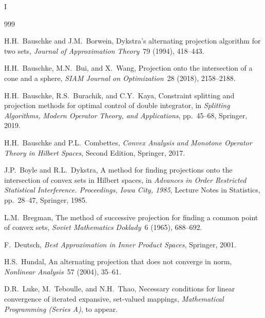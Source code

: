 I\documentclass[12pt]{article}
\newcommand{\seppone}{\setlength{\itemsep}{-1pt}}
\begin{document}
\begin{thebibliography}{999}
\seppone

H.H.\ Bauschke and J.M.\ Borwein,
Dykstra's alternating projection algorithm
for two sets,
\emph{Journal of Approximation Theory}~79 (1994), 418--443. 

H.H.\ Bauschke, M.N.\ Bui, and X.\ Wang,
Projection onto the intersection of a cone
and a sphere,
\emph{SIAM Journal on Optimization}~28 (2018), 2158--2188.

H.H.\ Bauschke, R.S.\ Burachik, and C.Y.\ Kaya,
Constraint splitting and projection methods for 
optimal control of double integrator,
in 
\emph{Splitting Algorithms, Modern Operator Theory, 
and Applications}, pp.~45--68, Springer, 2019. 

H.H.\ Bauschke and P.L.\ Combettes,
\emph{Convex Analysis and Monotone 
Operator Theory in Hilbert Spaces},
Second Edition,
Springer, 2017.

J.P.\ Boyle and R.L.\ Dykstra,
A method for finding projections onto the intersection 
of convex sets in Hilbert spaces, in 
\emph{Advances in Order Restricted Statistical Interference. 
Proceedings, Iowa City, 1985}, 
Lecture Notes in Statistics, pp.~28--47, Springer, 1985. 

L.M.\ Bregman,
The method of successive projection for finding 
a common point of convex sets,
\emph{Soviet Mathematics Doklady}~6 (1965), 688--692. 

F.\ Deutsch,
\emph{Best Approximation in Inner Product Spaces},
Springer, 2001. 


H.S.\ Hundal,
An alternating projection that does not converge in norm,
\emph{Nonlinear Analysis}~57 (2004), 35--61. 

D.R.\ Luke, M.\ Teboulle, and N.H.\ Thao,
Necessary conditions for linear convergence of 
iterated expansive, set-valued mappings,
\emph{Mathematical Programming (Series A)}, to appear. 


\end{thebibliography}
\end{document}
